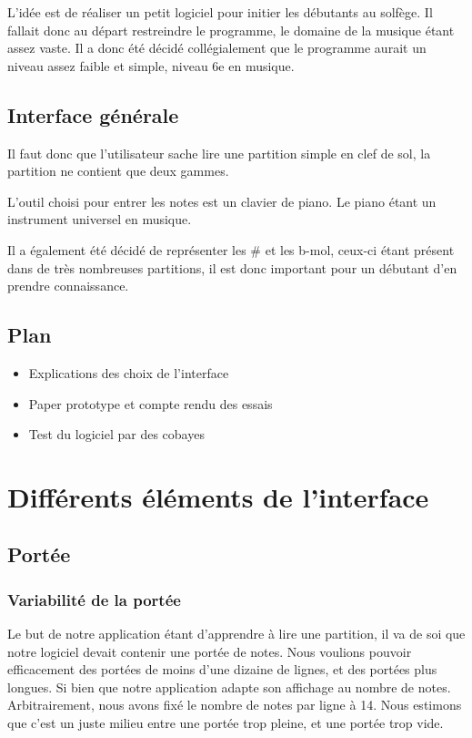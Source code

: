 \documentclass{article}
\begin{document}
L'idée est de réaliser un petit logiciel pour initier les débutants au solfège. Il fallait donc au départ restreindre le programme,
le domaine de la musique étant assez vaste. Il a donc été décidé collégialement que le programme aurait un niveau assez faible et 
simple, niveau 6e en musique.


\subsection{Interface générale}

\vspace{1cm}

Il faut donc que l'utilisateur sache lire une partition simple en clef de sol, la partition ne contient que deux gammes.

L'outil choisi pour entrer les notes est un clavier de piano. Le piano étant un instrument universel en musique.


Il a également été décidé de représenter les \#
{ }et les b-mol, ceux-ci étant présent dans de très nombreuses partitions, il est donc
important pour un débutant d'en prendre connaissance.


\subsection{Plan}
\begin{itemize}
\item Explications des choix de l'interface
\item Paper prototype et compte rendu des essais
\item Test du logiciel par des cobayes
\end{itemize}

\newpage
\section{Différents éléments de l'interface}

\subsection{Portée}
\subsubsection{Variabilité de la portée}
Le but de notre application étant d'apprendre à lire une partition, il va de soi que notre logiciel devait contenir une portée de notes. 
Nous voulions pouvoir efficacement des portées de moins d'une dizaine de lignes, et des portées plus longues. Si bien que notre application adapte son affichage au nombre de notes. Arbitrairement, nous avons fixé le nombre de notes par ligne à 14. Nous estimons que c'est un juste milieu entre une portée trop pleine, et une portée trop vide.
\end{document}
